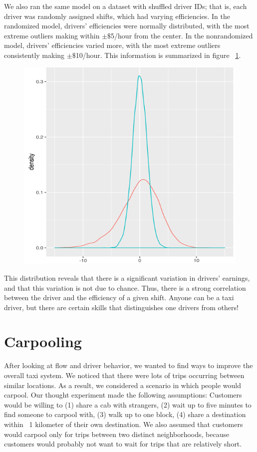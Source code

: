 \documentclass[twocolumn]{article}
\begin{document}
We also ran the same model on a dataset with shuffled driver IDs; that is, each driver was randomly assigned shifts, which had varying efficiencies. In the randomized model, drivers' efficiencies were normally distributed, with the most extreme outliers making within $\pm$$\$$5/hour from the center. In the nonrandomized model, drivers' efficiencies varied more, with the most extreme outliers consistently making $\pm$$\$$10/hour. This information is summarized in figure ~\ref{fig:efficiency}.
\begin{figure}[h]
  \centering
  \includegraphics[width=.9\linewidth]{efficiency}
  \label{fig:efficiency}
  
\end{figure}
This distribution reveals that there is a significant variation in drivers’ earnings, and that this variation is not due to chance. Thus, there is a strong correlation between the driver and the efficiency of a given shift. Anyone can be a taxi driver, but there are certain skills that distinguishes one drivers from others! 
\section{Carpooling}
After looking at flow and driver behavior, we wanted to find ways to improve the overall taxi system. We noticed that there were lots of trips occurring between similar locations. As a result, we considered a scenario in which people would carpool. Our thought experiment made the following assumptions: Customers would be willing to (1) share a cab with strangers, (2) wait up to five minutes to find someone to carpool with, (3) walk up to one block, (4) share a destination within ~1 kilometer of their own destination. We also assumed that customers would carpool only for trips between two distinct neighborhoods, because customers would probably not want to wait for trips that are relatively short.
\end{document}
